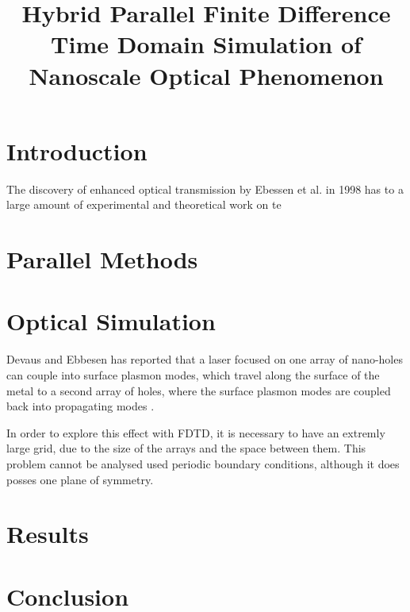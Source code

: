 \documentclass[11pt, conference, draftcls, letterpaper]{IEEEtran}
\begin{document}
\title{Hybrid Parallel Finite Difference Time Domain Simulation of
  Nanoscale Optical Phenomenon}
\author{ 
}

\maketitle

\begin{abstract}
  
\end{abstract}


\section{Introduction}
The discovery of enhanced optical transmission by Ebessen
et al. \cite{ebessen1998} in 1998 has  to a large amount of
experimental and theoretical work on te



\section{Parallel Methods}


\section{Optical Simulation}
Devaus and Ebbesen has reported that a laser focused on one array of
nano-holes can couple into surface plasmon modes, which travel along
the surface of the metal to a second array of holes, where the surface
plasmon modes are coupled back into propagating modes \cite{devaux2003}.

In order to explore this effect with FDTD, it is necessary to have
an extremly large grid, due to the size of the arrays and the space
between them. This problem cannot be analysed used periodic boundary
conditions, although it does posses one plane of symmetry. 

\section{Results}

\section{Conclusion}




\end{document}
